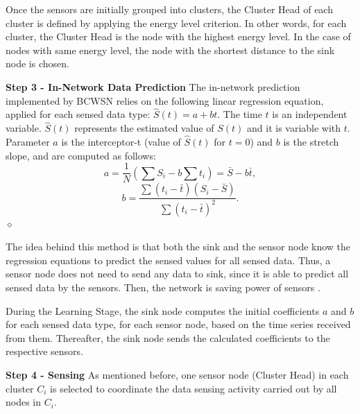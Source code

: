 \documentclass{acm_proc_article-sp}
\newcommand{\dia}{\hspace*{.1cm} \hfill $\diamond$}
\begin{document}
Once the sensors are initially grouped into clusters, the Cluster Head of each
cluster is defined by applying the energy level criterion.
In other words, for each cluster, the Cluster Head is the node with the highest
energy level. In the case of nodes with same energy level, the node with the
shortest distance to the sink node is chosen.
\vspace*{-.3cm}

{\bf Step 3 - In-Network Data Prediction}
The in-network prediction implemented by BCWSN relies on the
following linear regression equation, applied for each sensed data type:
$\hat{S}(t) = a + bt$.
The time $t$ is an independent variable. $\hat{S}(t)$ represents the estimated
value of $S(t)$ and it is variable with $t$. Parameter $a$ is the interceptor-t
(value of $\hat{S}(t)$ for $t=0$) and $b$ is the stretch slope, and are computed
as follows:
\begin{equation}
\label{coef-a}
	a = \frac{1}{N}\left(\sum S_{i} - b\sum t_{i} \right) = \bar{S} - b\bar{t},
\end{equation}
\vspace*{-.3cm}
\begin{equation}
\label{coef-b}
	b = \frac{\sum \left(t_{i} - \bar{t}\right)\left(S_{i} - \bar{S}\right)}{\sum \left(t_{i} - \bar{t}\right)^{2}}.
\end{equation}
	\dia
\vspace*{-.4cm}

The idea behind this method is that both the sink and the sensor node know the
regression equations to predict the sensed values for all sensed data. Thus, a
sensor node does not need to send any data to sink, since it is able to predict
all sensed data by the sensors. Then, the network is saving power of sensors
\cite{MaiaACR2013}.
\vspace*{-.3cm}

During the Learning Stage, the sink node computes the initial coefficients $a$
and $b$ for each sensed data type, for each sensor node, based on the time
series received from them. Thereafter, the sink node sends the calculated
coefficients to the respective sensors.
\vspace*{-.3cm}

{\bf Step 4 - Sensing}
As mentioned before, one sensor node (Cluster Head) in each cluster $C_{i}$ is
selected to coordinate the data sensing activity carried out by all nodes in
$C_{i}$.
\vspace*{-.3cm}
\end{document}

